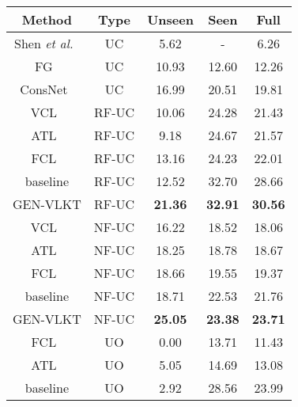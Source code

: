 \documentclass[10pt,twocolumn,letterpaper]{article}
\begin{document}
\begin{table}[t]
\small
  \begin{center}
  \begin{tabular}{ccccc}
  \hline
  Method        &Type  & Unseen & Seen & Full \\
  \hline\hline
  Shen \emph{et al.}~\cite{shen2018scaling}      		&UC				    & 5.62  & - & 6.26\\
  FG~\cite{Bansal2020_aaai_functional}      		&UC				    & 10.93  & 12.60 & 12.26\\
  ConsNet~\cite{liu2020consnet}      		&UC				    & 16.99  & 20.51 & 19.81\\
  \hline
  VCL~\cite{hou2020visual}      		&RF-UC				    & 10.06  & 24.28 & 21.43\\
  ATL~\cite{hou2021affordance}      		&RF-UC				    & 9.18  & 24.67 & 21.57\\
  FCL~\cite{hou2021detecting}      		&RF-UC				    & 13.16  & 24.23 & 22.01\\
  \cellcolor{mygray-bg}baseline			 	&\cellcolor{mygray-bg}RF-UC			        &\cellcolor{mygray-bg}12.52  &\cellcolor{mygray-bg}32.70  &\cellcolor{mygray-bg}28.66\\
  \cellcolor{mygray-bg}GEN-VLKT			 	&\cellcolor{mygray-bg}RF-UC			        &\cellcolor{mygray-bg}\textbf{21.36}  &\cellcolor{mygray-bg}\textbf{32.91}  &\cellcolor{mygray-bg}\textbf{30.56}\\
  \hline 
  VCL~\cite{hou2020visual}      		&NF-UC				    & 16.22  & 18.52 & 18.06\\
  ATL~\cite{hou2021affordance}      		&NF-UC				    & 18.25  & 18.78 & 18.67\\
  FCL~\cite{hou2021detecting}      		&NF-UC				    & 18.66  & 19.55 & 19.37\\
  \cellcolor{mygray-bg}baseline		 	&\cellcolor{mygray-bg}NF-UC			        &\cellcolor{mygray-bg}18.71  &\cellcolor{mygray-bg}22.53  &\cellcolor{mygray-bg}21.76\\
  \cellcolor{mygray-bg}GEN-VLKT			 	&\cellcolor{mygray-bg}NF-UC			        &\cellcolor{mygray-bg}\textbf{25.05}  &\cellcolor{mygray-bg}\textbf{23.38}  &\cellcolor{mygray-bg}\textbf{23.71}\\
  \hline 
  FCL~\cite{hou2021detecting}      		&UO				    & 0.00  & 13.71 & 11.43\\
  ATL~\cite{hou2021affordance}      		&UO				    & 5.05  & 14.69 & 13.08\\
  \cellcolor{mygray-bg}baseline			 	&\cellcolor{mygray-bg}UO			        &\cellcolor{mygray-bg}2.92  &\cellcolor{mygray-bg}28.56  &\cellcolor{mygray-bg}23.99\\

\end{tabular}
\end{center}
\end{table}
\end{document}
